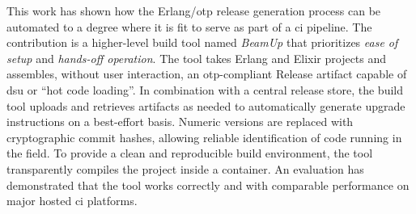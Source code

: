 This work has shown how the Erlang/\acrshort{otp} release generation process can be automated to a degree where it is fit to serve as part of a \acrfull{ci} pipeline. The contribution is a higher-level build tool named \emph{BeamUp} that prioritizes \emph{ease of setup} and \emph{hands-off operation}. The tool takes Erlang and Elixir projects and assembles, without user interaction, an \acrshort{otp}-compliant Release artifact capable of \acrfull{dsu} or ``hot code loading''. In combination with a central release store, the build tool uploads and retrieves artifacts as needed to automatically generate upgrade instructions on a best-effort basis. Numeric versions are replaced with cryptographic commit hashes, allowing reliable identification of code running in the field. To provide a clean and reproducible build environment, the tool transparently compiles the project inside a container. An evaluation has demonstrated that the tool works correctly and with comparable performance on major hosted \acrshort{ci} platforms.

